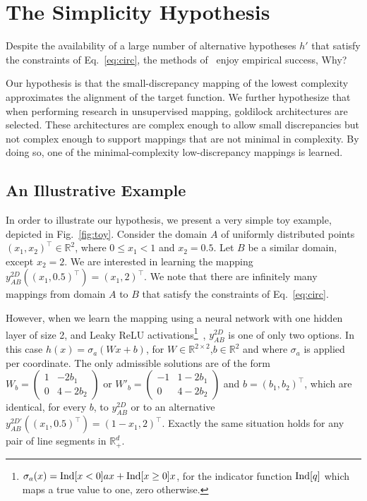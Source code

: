 \documentclass{article} %
\begin{document}
\section{The Simplicity Hypothesis}
\label{sec:hypothesis}

Despite the availability of a large number of alternative  hypotheses $h'$ that satisfy the constraints of Eq.~\ref{eq:circ}, the methods of~\cite{xia2016dual,discogan,CycleGAN2017,dualgan} enjoy empirical success, Why? 

Our hypothesis is that the small-discrepancy mapping of the lowest complexity approximates the alignment of the target function. We further hypothesize that when performing research in unsupervised mapping, goldilock architectures are selected. These architectures are complex enough to allow small discrepancies but not complex enough to support mappings that are not minimal in complexity. By doing so, one of the minimal-complexity low-discrepancy mappings is learned.

\subsection{An Illustrative Example}
\label{sec:toy}

In order to illustrate our hypothesis, we present a very simple toy example, depicted in Fig.~\ref{fig:toy}. Consider the domain $A$ of uniformly distributed points $(x_1,x_2)^\top \in \mathbb{R}^2$, where $0 \leq x_1 < 1$ and $x_2=0.5$. Let $B$ be a similar domain, except $x_2=2$. We are interested in learning the mapping $y^{2D}_{AB}((x_1,0.5)^\top) = (x_1,2)^\top$. We note that there are infinitely many mappings from domain $A$ to $B$ that satisfy the constraints of Eq.~\ref{eq:circ}.

However, when we learn the mapping using a neural network with one hidden layer of size 2, and Leaky ReLU activations\footnote{$\sigma_a(x) = \textnormal{Ind}[x<0] ax + \textnormal{Ind}[x\geq 0]x$, for the indicator function $\textnormal{Ind}[q]$ which maps a true value to one, zero otherwise.}~\citep{maas2013rectifier}, $y^{2D}_{AB}$ is one of only two options. In this case $h(x) = \sigma_a(Wx+b)$, for $W\in \mathbb{R}^{2\times 2}$,$b\in \mathbb{R}^2$ and where $\sigma_a$ is applied per coordinate. The only admissible solutions are of the form $W_b =  \left( \begin{array}{cc}
1 & -2b_1  \\
0 & 4-2b_2  \end{array} \right)$ or $W'_b=
 \left( \begin{array}{cc}
-1 & 1-2b_1  \\
0 & 4-2b_2  
\end{array} \right)$ and $b = (b_1,b_2)^\top$, which are identical, for every $b$, to $y^{2D}_{AB}$ or to an alternative  $y^{2D'}_{AB}((x_1,0.5)^\top) = (1-x_1,2)^\top$. Exactly the same situation holds for any pair of line segments in $\mathbb{R}_+^d$.
\end{document}
